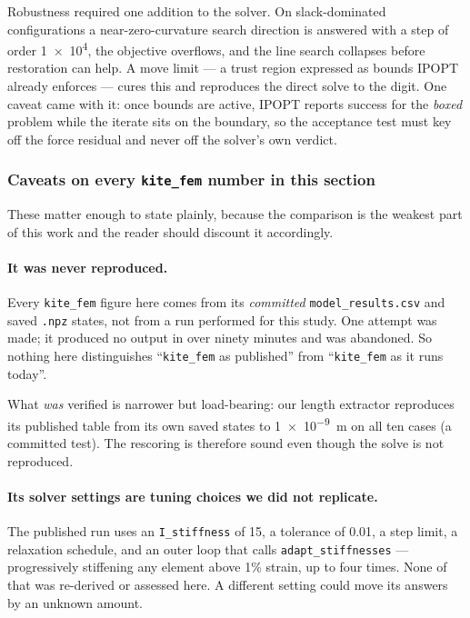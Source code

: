 \documentclass[11pt,a4paper]{article}
\begin{document}
Robustness required one addition to the solver. On slack-dominated
configurations a near-zero-curvature search direction is answered with a step of
order \num{1e4}, the objective overflows, and the line search collapses before
restoration can help. A move limit --- a trust region expressed as bounds IPOPT
already enforces --- cures this and reproduces the direct solve to the digit.
One caveat came with it: once bounds are active, IPOPT reports success for the
\emph{boxed} problem while the iterate sits on the boundary, so the acceptance
test must key off the force residual and never off the solver's own verdict.

\subsubsection{Caveats on every \texttt{kite\_fem} number in this section}
\label{sec:hang-caveats}

These matter enough to state plainly, because the comparison is the weakest part
of this work and the reader should discount it accordingly.

\paragraph{It was never reproduced.} Every \texttt{kite\_fem} figure here comes
from its \emph{committed} \texttt{model\_results.csv} and saved \texttt{.npz}
states, not from a run performed for this study. One attempt was made; it
produced no output in over ninety minutes and was abandoned. So nothing here
distinguishes ``\texttt{kite\_fem} as published'' from ``\texttt{kite\_fem} as it
runs today''.

What \emph{was} verified is narrower but load-bearing: our length extractor
reproduces its published table from its own saved states to \SI{1e-9}{m} on all
ten cases (a committed test). The rescoring is therefore sound even though the
solve is not reproduced.

\paragraph{Its solver settings are tuning choices we did not replicate.} The
published run uses an \texttt{I\_stiffness} of 15, a tolerance of \num{0.01}, a
step limit, a relaxation schedule, and an outer loop that calls
\texttt{adapt\_stiffnesses} --- progressively stiffening any element above 1\%
strain, up to four times. None of that was re-derived or assessed here. A
different setting could move its answers by an unknown amount.
\end{document}
